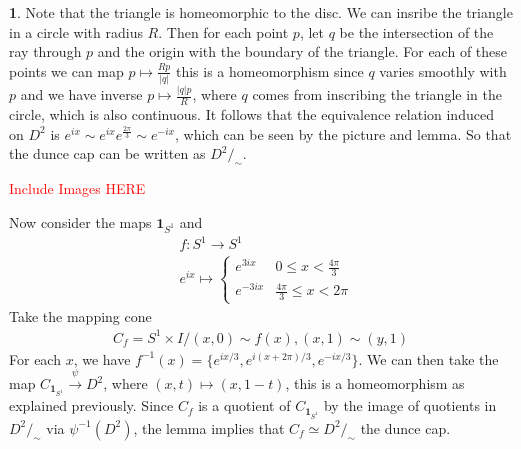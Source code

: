 \documentclass[10.5pt]{article}
\theoremstyle{definition}
\newtheorem{pb}{}
\newcommand{\set}[1]{\{#1\}}
\newcommand{\abs}[1]{\lvert#1\rvert}
\newcommand{\ism}{\simeq}
\begin{document}
    \begin{pb}
        Note that the triangle is homeomorphic to the disc. We can insribe the triangle in a circle with radius \(R\). Then for each point \(p\), let \(q\) be the intersection
        of the ray through \(p \) and the origin with the boundary of the triangle. For each of these points we can map \(p \mapsto \frac{Rp }{\abs{q }}\) this is a homeomorphism
        since \(q\) varies smoothly with \(p\) and we have inverse \(p \mapsto \frac{\abs{q}p}{R}\), where \(q\) comes from inscribing the triangle in the circle, which is also continuous.
        It follows that the equivalence relation induced on \(D^2\) is \(e^{ix} \sim e^{ix}e^{\frac{2\pi}{3}} \sim e^{-ix}\), which can be seen by the picture and lemma. So that
        the dunce cap can be written as \(D^2/_\sim\).

        \textcolor{red}{Include Images HERE}

        Now consider the maps \(\mathbf{1}_{S^1}\) and
        \begin{align*}
            &f:S^1 \to S^1 \\
            &e^{ix} \mapsto \begin{cases}
                e^{3ix} & 0 \leq x < \frac{4\pi}{3} \\
                e^{-3ix} & \frac{4\pi}{3} \leq x < 2\pi
            \end{cases}
        \end{align*}
        Take the mapping cone 
        \begin{align*}
            C_f = S^1 \times I / (x,0) \sim f(x), (x,1) \sim (y,1)
        \end{align*}
        For each \(x\), we have \(f^{-1}(x) = \set{e^{ix/3},e^{i(x + 2\pi)/3},e^{-ix/3}}\). We can then take the map \(C_{\mathbf{1}_{S^1}} \overset{\psi}{\to} D^2\), where \((x,t) \mapsto (x,1-t)\), this is a homeomorphism as explained previously. 
        Since \(C_f\) is a quotient of \(C_{\mathbf{1}_{S^1}}\) by the image of quotients in \(D^2/_\sim\) via \(\psi^{-1}(D^2)\), the lemma implies that \(C_f \ism D^2/_\sim\) the dunce cap.


\end{pb}
\end{document}
